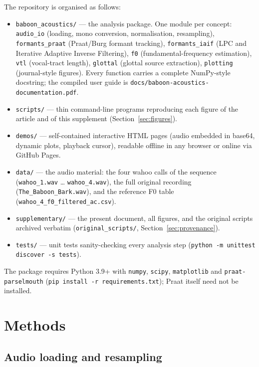 \documentclass[11pt,a4paper]{article}
\newcommand{\file}[1]{\texttt{#1}}
\begin{document}
The repository is organised as follows:
\begin{itemize}
\item \file{baboon\_acoustics/} --- the analysis package. One module per
      concept: \file{audio\_io} (loading, mono conversion, normalisation,
      resampling), \file{formants\_praat} (Praat/Burg formant tracking),
      \file{formants\_iaif} (LPC and Iterative Adaptive Inverse
      Filtering), \file{f0} (fundamental-frequency estimation),
      \file{vtl} (vocal-tract length), \file{glottal} (glottal source
      extraction), \file{plotting} (journal-style figures). Every
      function carries a complete NumPy-style docstring; the compiled
      user guide is \file{docs/baboon-acoustics-documentation.pdf}.
\item \file{scripts/} --- thin command-line programs reproducing each
      figure of the article and of this supplement
      (Section~\ref{sec:figures}).
\item \file{demos/} --- self-contained interactive HTML pages (audio
      embedded in base64, dynamic plots, playback cursor), readable
      offline in any browser or online via GitHub Pages.
\item \file{data/} --- the audio material: the four wahoo calls of the
      sequence (\file{wahoo\_1.wav} \ldots{} \file{wahoo\_4.wav}), the
      full original recording (\file{The\_Baboon\_Bark.wav}), and the
      reference F0 table (\file{wahoo\_4\_f0\_filtered\_ac.csv}).
\item \file{supplementary/} --- the present document, all figures, and
      the original scripts archived verbatim
      (\file{original\_scripts/}, Section~\ref{sec:provenance}).
\item \file{tests/} --- unit tests sanity-checking every analysis step
      (\file{python -m unittest discover -s tests}).
\end{itemize}

The package requires Python 3.9+ with \file{numpy}, \file{scipy},
\file{matplotlib} and \file{praat-parselmouth}
(\file{pip install -r requirements.txt}); Praat itself need not be
installed.

\section{Methods}
\label{sec:methods}

\subsection{Audio loading and resampling}
\end{document}
